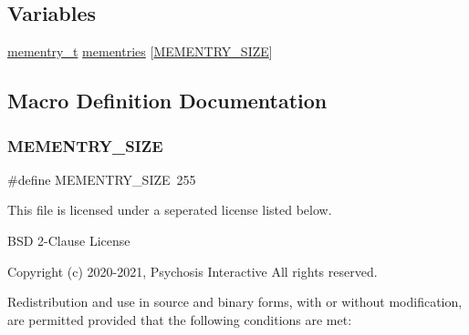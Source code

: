 \subsection*{Variables}
\begin{DoxyCompactItemize}
\item 
\hyperlink{a00110_a876b6ee19692762a87e4673911f9b8da_a876b6ee19692762a87e4673911f9b8da}{mementry\+\_\+t} \hyperlink{a00107_a9ec3d7a60bca9bd965aba15905c6d1ed_a9ec3d7a60bca9bd965aba15905c6d1ed}{mementries} \mbox{[}\hyperlink{a00107_a48623ea6ed429e2f046b49041dde1dc5_a48623ea6ed429e2f046b49041dde1dc5}{M\+E\+M\+E\+N\+T\+R\+Y\+\_\+\+S\+I\+ZE}\mbox{]}
\end{DoxyCompactItemize}


\subsection{Macro Definition Documentation}
\mbox{\label{a00107_a48623ea6ed429e2f046b49041dde1dc5_a48623ea6ed429e2f046b49041dde1dc5}} 
\subsubsection{\texorpdfstring{M\+E\+M\+E\+N\+T\+R\+Y\+\_\+\+S\+I\+ZE}{MEMENTRY\_SIZE}}
{\footnotesize\ttfamily \#define M\+E\+M\+E\+N\+T\+R\+Y\+\_\+\+S\+I\+ZE~255}



This file is licensed under a seperated license listed below. 

B\+SD 2-\/\+Clause License

Copyright (c) 2020-\/2021, Psychosis Interactive All rights reserved.

Redistribution and use in source and binary forms, with or without modification, are permitted provided that the following conditions are met\+:

